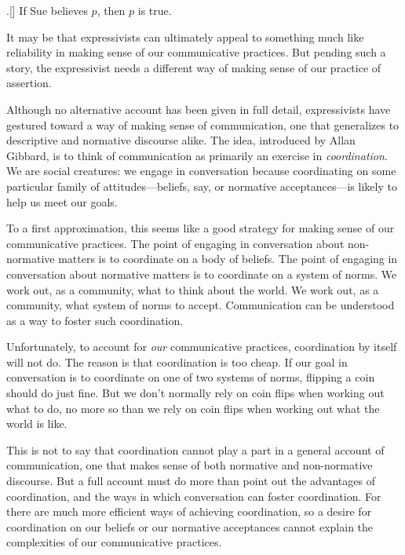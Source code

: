 \documentclass[11pt,article,oneside]{memoir}
\begin{document}
\ex.[] If Sue believes $p$, then $p$ is true.

It may be that expressivists can ultimately appeal to something much like reliability in making sense of our communicative practices. But pending such a story, the expressivist needs a different way of making sense of our practice of assertion. 

Although no alternative account has been given in full detail, expressivists have gestured toward a way of making sense of communication, one that generalizes to descriptive and normative discourse alike. The idea, introduced by Allan Gibbard, is to think of communication as primarily an exercise in \emph{coordination}. We are social creatures: we engage in conversation because coordinating on some particular family of attitudes---beliefs, say, or normative acceptances---is likely to help us meet our goals. 

To a first approximation, this seems like a good strategy for making sense of our communicative practices. The point of engaging in conversation about non-normative matters is to coordinate on a body of beliefs. The point of engaging in conversation about normative matters is to coordinate on a system of norms. We work out, as a community, what to think about the world. We work out, as a community, what system of norms to accept. Communication can be understood as a way to foster such coordination. 

Unfortunately, to account for \emph{our} communicative practices, coordination by itself will not do. The reason is that coordination is too cheap. If our goal in conversation is to coordinate on one of two systems of norms, flipping a coin should do just fine. But we don't normally rely on coin flips when working out what to do, no more so than we rely on coin flips when working out what the world is like. 

This is not to say that coordination cannot play a part in a general account of communication, one that makes sense of both normative and non-normative discourse. But a full account must do more than point out the advantages of coordination, and the ways in which conversation can foster coordination. For there are much more efficient ways of achieving coordination, so a desire for coordination on our beliefs or our normative acceptances cannot explain the complexities of our communicative practices. 

\end{document}
